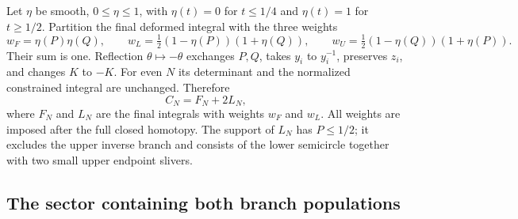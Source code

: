 \documentclass[11pt]{article}
\numberwithin{equation}{section}
\theoremstyle{remark}\newtheorem{remark}[theorem]{Remark}
\begin{document}
Let $\eta$ be smooth, $0\le\eta\le1$, with $\eta(t)=0$ for
$t\le1/4$ and $\eta(t)=1$ for $t\ge1/2$.  Partition the final
deformed integral with the three weights
\[
 w_F=\eta(P)\eta(Q),\qquad
 w_L=\tfrac12(1-\eta(P))(1+\eta(Q)),\qquad
 w_U=\tfrac12(1-\eta(Q))(1+\eta(P)).
\]
Their sum is one.  Reflection $\theta\mapsto-\theta$ exchanges
$P,Q$, takes $y_i$ to $y_i^{-1}$, preserves $z_i$, and changes
$K$ to $-K$. For even $N$ its determinant and the normalized
constrained integral are unchanged. Therefore
\begin{equation}\label{eq:constrained-split}
 C_N=F_N+2L_N,
\end{equation}
where $F_N$ and $L_N$ are the final integrals with weights $w_F$
and $w_L$.  All weights are imposed after the full closed homotopy.
The support of $L_N$ has $P\le1/2$; it excludes the upper inverse
branch and consists of the lower semicircle together with two small
upper endpoint slivers.

\subsection{The sector containing both branch populations}
\end{document}
